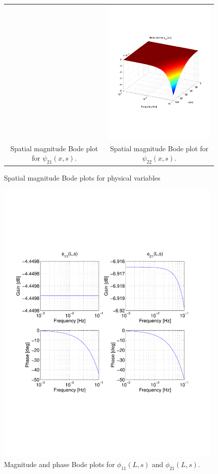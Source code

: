 \documentclass[preprint]{elsarticle}
\begin{document}
\begin{figure}
\begin{tabular}{cc}
&
\includegraphics[trim = 0mm 60mm 0mm 60mm, width = 8cm]{distr22_-3to-1}
\tabularnewline
Spatial magnitude Bode plot for $\psi_{21}(x,s)$.
&
Spatial magnitude Bode plot for $\psi_{22}(x,s)$.
\tabularnewline
\end{tabular}
\caption{Spatial magnitude Bode plots for physical variables\label{Magn_spatial_physx}}
\end{figure}

\begin{figure}[H]
\centering
\includegraphics[trim = 0mm 60mm 0mm 60mm, width = 110mm]{diagIOfreeflow}
\caption{Magnitude and phase Bode plots for $\phi_{11}(L,s)$ and $\phi_{21}(L,s)$.\label{fig:Magn_phase_diag}}
\end{figure}
\end{document}
